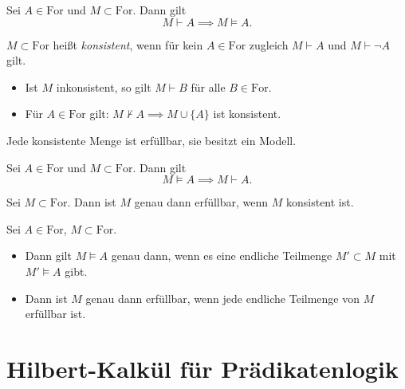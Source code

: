 \documentclass{cheat-sheet}
\newcommand{\For}{\mathrm{For}} %
\begin{document}

\begin{satz}[Korrektheitssatz]
  Sei $A \in \For$ und $M \subset \For$. Dann gilt
  \[ M \vdash A \implies M \models A. \]
\end{satz}

\begin{defn}
  $M \subset \For$ heißt \emph{konsistent}, wenn für kein $A \in \For$ zugleich $M \vdash A$ und $M \vdash \neg A$ gilt.
\end{defn}

\begin{lem}
  \begin{itemize}
    \item Ist $M$ inkonsistent, so gilt $M \vdash B$ für alle $B \in \For$.
    \item Für $A \in \For$ gilt: $M \not\vdash A \implies M \cup \{ A \}$ ist konsistent.
  \end{itemize}
\end{lem}

\begin{lem}
  Jede konsistente Menge ist erfüllbar, \dh{} sie besitzt ein Modell.
\end{lem}

\begin{satz}[Vollständigkeitssatz]
  Sei $A \in \For$ und $M \subset \For$. Dann gilt
  \[ M \models A \implies M \vdash A. \]
\end{satz}

\begin{prop}
  Sei $M \subset \For$. Dann ist $M$ genau dann erfüllbar, wenn $M$ konsistent ist.
\end{prop}

\begin{samepage}

\begin{satz}
  Sei $A \in \For$, $M \subset \For$.
  \begin{itemize}
    \item Dann gilt $M \models A$ genau dann, wenn es eine endliche Teilmenge $M' \subset M$ mit $M' \models A$ gibt.
    \item Dann ist $M$ genau dann erfüllbar, wenn jede endliche Teilmenge von $M$ erfüllbar ist.
  \end{itemize}
\end{satz}

\section{Hilbert-Kalkül für Prädikatenlogik}
  
\end{samepage}
\end{document}
